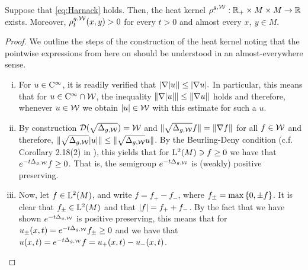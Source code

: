 \documentclass[a4paper, 12pt]{amsart}
\begin{document}
\begin{prop}
\label{prop:MainRed}
Suppose that \eqref{eq:Harnack} holds. Then, the heat
kernel $\rho^{g,\mathcal{W}}_{\cdotp}: \mathbb{R}_{+} \times M \times M \to \mathbb{R}$
exists. Moreover, $\rho^{g,\mathcal{W}}_t(x,y) > 0$ for
every $t > 0$ and almost every $x,\ y \in M$. 
\end{prop} 
\begin{proof}
We outline the steps of the construction of the heat kernel
noting that the pointwise expressions from here on should be
understood in an almost-everywhere sense.
\begin{enumerate}[(i)]
\item For $u \in {\rm C}^{\infty}_{\rm {}}$, it is readily verified that 
	$| \nabla |u|| \leq | \nabla u|.$
	In particular, this means that 
	for $u \in {\rm C}^{\infty}_{\rm {}} \cap \mathcal{W}$,
	the inequality
	$\| \nabla |u| \| \leq \| \nabla u \|$ holds
	and therefore, whenever $u \in \mathcal{W}$
	we obtain $|u| \in \mathcal{W}$ 
	with this estimate for such a $u$.

\item 	By construction ${\mathcal{D}}(\sqrt{\Delta_{g, \mathcal{W}}}) = \mathcal{W}$
	and $\| \sqrt{\Delta_{g,\mathcal{W}}} f \| = \| \nabla f \|$
	for all $f \in \mathcal{W}$ and therefore, 
	$\| \sqrt{\Delta_{g, \mathcal{W}}} |u| \| 
		\leq \| \sqrt{\Delta_{g, \mathcal{W}}} u \|$. 
	By the Beurling-Deny condition (c.f.  Corollary 2.18(2) in  \cite{El-Maati}), 
	this yields that for ${\rm L}^{2}_{\rm {}}(M) \ni f \geq 0$
	we have that  $e^{-t \Delta_{g,\mathcal{W}}} f \geq 0$. That is, the semigroup 
	$e^{-t \Delta_{g,\mathcal{W}}}$ is (weakly) positive preserving.

\item Now, let $f \in {\rm L}^{2}_{\rm {}}(M)$, and write
	$f = f_+ - f_-$, where $f_{\pm} = \max\left\{0,\pm f\right\}$.
	It is clear that $f_{\pm} \in {\rm L}^{2}_{\rm {}}(M)$
	and that $|f| = f_+ + f_-$.
	By the fact that we have shown $e^{-t\Delta_{g,\mathcal{W}}}$ 
	is positive preserving, this means that
	for $u_{\pm} (x,t) = e^{-t\Delta_{g,\mathcal{W}}} f_{\pm} \geq 0$	
	and we have that $u(x,t) = e^{-t \Delta_{g,\mathcal{W}}} f = u_+(x,t) - u_-(x,t)$.


\end{enumerate}
\end{proof}
\end{document}
